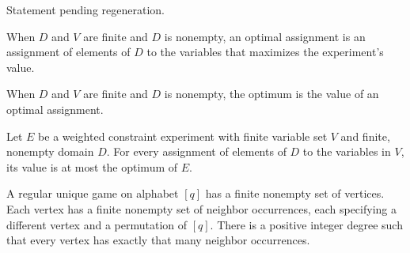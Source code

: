 \begin{theorem}
\label{FABL.WeightedConstraintExperiment.value_mem_Icc}
\leanok
{}
Statement pending regeneration.
\end{theorem}

\begin{definition}
\label{FABL.WeightedConstraintExperiment.optimalAssignment}
\leanok
{}
When $D$ and $V$ are finite and $D$ is nonempty, an optimal assignment is an assignment
of elements of $D$ to the variables that maximizes the experiment's value.
\end{definition}

\begin{definition}
\label{FABL.WeightedConstraintExperiment.optimum}
\leanok
{}
When $D$ and $V$ are finite and $D$ is nonempty, the optimum is the value of an optimal
assignment.
\end{definition}

\begin{theorem}
\label{FABL.WeightedConstraintExperiment.value_le_optimum}
\leanok
{}
Let $E$ be a weighted constraint experiment with finite variable set $V$ and finite,
nonempty domain $D$. For every assignment of elements of $D$ to the variables in $V$,
its value is at most the optimum of $E$.
\end{theorem}

\begin{definition}
\label{FABL.RegularUniqueGame}
\leanok
A regular unique game on alphabet $[q]$ has a finite nonempty set of vertices. Each
vertex has a finite nonempty set of neighbor occurrences, each specifying a different
vertex and a permutation of $[q]$. There is a positive integer degree such that every
vertex has exactly that many neighbor occurrences.
\end{definition}

